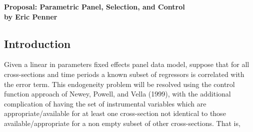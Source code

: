 \documentclass[10pt]{article}
\begin{document}
\doublespacing
\begin{center} 
\Large \bf Proposal: Parametric Panel, Selection, and Control \\
 \large by Eric Penner \rm
\end{center} 


\subsection*{Introduction } 
\noindent Given a linear in parameters fixed effects panel data model, suppose that for all cross-sections and time periods a known subset of regressors is correlated with the error term. This endogeneity problem will be resolved using the control function approach of Newey, Powell, and Vella (1999), with the additional complication of having the set of instrumental variables which are appropriate/available for at least one cross-section  not identical to those available/appropriate for a non empty subset of other cross-sections. That is, 
\end{document}
